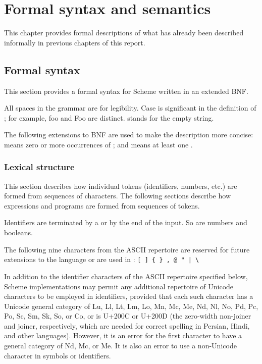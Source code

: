\chapter{Formal syntax and semantics}
\label{formalchapter}

This chapter provides formal descriptions of what has already been
described informally in previous chapters of this report.

\section{Formal syntax}
\label{BNF}

This section provides a formal syntax for Scheme written in an extended
BNF.

All spaces in the grammar are for legibility.  Case is significant
in the definition of ; for example,  {\cf foo} and {\cf Foo}
are distinct.
 stands for the empty string.

The following extensions to BNF are used to make the description more
concise:   means zero or more occurrences of
; and  means at least one
.

\subsection{Lexical structure}

This section describes how individual tokens (identifiers,
numbers, etc.) are formed from sequences of characters.  The following
sections describe how expressions and programs are formed from sequences
of tokens.

\vest Identifiers are
terminated by a  or by the end of the input.
So are numbers and booleans.

The following nine characters from the ASCII repertoire
are reserved for future extensions to the
language or are used in \rsevenrs:
{\tt \verb"[" \verb"]" \verb"{" \verb"}" \verb',' \verb'@'
\verb'"' \verb'|' \verb'\'}

In addition to the identifier characters of the ASCII repertoire specified
below, Scheme implementations may permit any additional repertoire of
Unicode characters to be employed in identifiers,
provided that each such character has a Unicode general category of Lu,
Ll, Lt, Lm, Lo, Mn, Mc, Me, Nd, Nl, No, Pd, Pc, Po, Sc, Sm, Sk, So,
or Co, or is U+200C or U+200D (the zero-width non-joiner and joiner,
respectively, which are needed for correct spelling in Persian, Hindi,
and other languages).
However, it is an error for the first character to have a general category
of Nd, Mc, or Me.  It is also an error to use a non-Unicode character
in symbols or identifiers.

